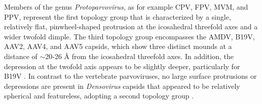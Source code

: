 Members of the genus \textit{Protoparvovirus}, as for example CPV, FPV, MVM, and PPV, represent the first topology group that is characterized by a single, relatively flat, pinwheel-shaped protrusion at the icosahedral threefold axes and a wider twofold dimple. The third topology group encompasses the AMDV, B19V, AAV2, AAV4, and AAV5 capsids, which show three distinct mounds at a distance of $\sim$20-26 \r{A} from the icosahedral threefold axes. In addition, the depression at the twofold axis appears to be slightly deeper, particularly for B19V \cite{pmid20375175, pmid12136130, tropism}. In contrast to the vertebrate parvoviruses, no large surface protrusions or depressions are present in \textit{Densovirus} capsids that appeared to be relatively spherical and featureless, adopting a second topology group \cite{pmid15769470, pmid9817847}.        






